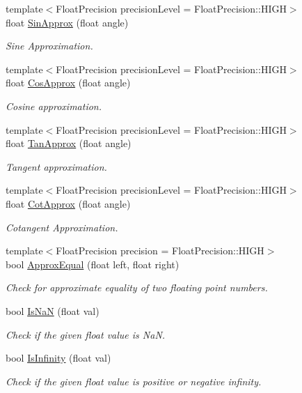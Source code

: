\begin{DoxyCompactItemize}
{\footnotesize template$<$Float\+Precision precision\+Level = Float\+Precision\+::\+H\+I\+G\+H$>$ }\\float \hyperlink{group___s_i_s_d_scalar_math_gaece3a06431141a5c010de32ea23bedcf}{Sin\+Approx} (float angle)
\begin{DoxyCompactList}\small\item\em Sine Approximation. \end{DoxyCompactList}\item 
{\footnotesize template$<$Float\+Precision precision\+Level = Float\+Precision\+::\+H\+I\+G\+H$>$ }\\float \hyperlink{group___s_i_s_d_scalar_math_ga6f84a45d1d98a6be758df9fc78615000}{Cos\+Approx} (float angle)
\begin{DoxyCompactList}\small\item\em Cosine approximation. \end{DoxyCompactList}\item 
{\footnotesize template$<$Float\+Precision precision\+Level = Float\+Precision\+::\+H\+I\+G\+H$>$ }\\float \hyperlink{group___s_i_s_d_scalar_math_ga38631bdf076826ca766dc35f3b150897}{Tan\+Approx} (float angle)
\begin{DoxyCompactList}\small\item\em Tangent approximation. \end{DoxyCompactList}\item 
{\footnotesize template$<$Float\+Precision precision\+Level = Float\+Precision\+::\+H\+I\+G\+H$>$ }\\float \hyperlink{group___s_i_s_d_scalar_math_gac1c6ea5bb8f4958158ccb1a33123d64b}{Cot\+Approx} (float angle)
\begin{DoxyCompactList}\small\item\em Cotangent Approximation. \end{DoxyCompactList}\item 
{\footnotesize template$<$Float\+Precision precision = Float\+Precision\+::\+H\+I\+G\+H$>$ }\\bool \hyperlink{group___s_i_s_d_scalar_math_gac302f56236758d08c1923095e381e53b}{Approx\+Equal} (float left, float right)
\begin{DoxyCompactList}\small\item\em Check for approximate equality of two floating point numbers. \end{DoxyCompactList}\item 
bool \hyperlink{group___s_i_s_d_scalar_math_gafa30a49468e40679f196b2bc791849e5}{Is\+Na\+N} (float val)
\begin{DoxyCompactList}\small\item\em Check if the given float value is Na\+N. \end{DoxyCompactList}\item 
bool \hyperlink{group___s_i_s_d_scalar_math_ga56a70269c92df99f699e0456613e4a52}{Is\+Infinity} (float val)
\begin{DoxyCompactList}\small\item\em Check if the given float value is positive or negative infinity. \end{DoxyCompactList}\end{DoxyCompactItemize}
